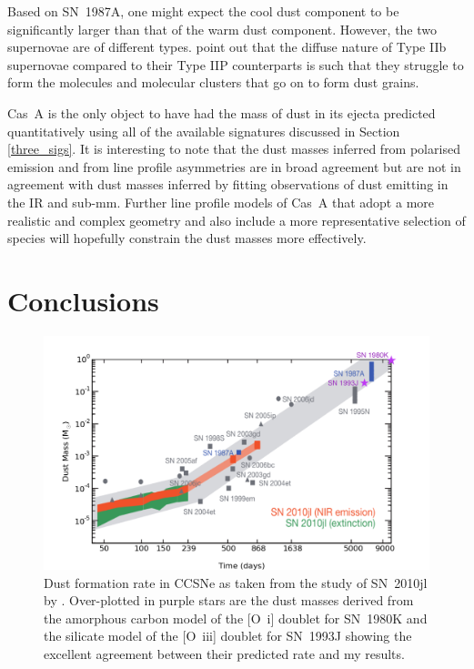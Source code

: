 Based on SN~1987A, one might expect the cool dust component to be significantly larger than that of the warm dust component.  However, the two supernovae are of different types. \citet{Biscaro2014} point out that the diffuse nature of Type IIb supernovae compared to their Type IIP counterparts is such that they struggle to form the molecules and molecular clusters that go on to form dust grains.   

Cas~A is the only object to have had the mass of dust in its ejecta predicted quantitatively using all of the available signatures discussed in Section \ref{three_sigs}.  It is interesting to note that the dust masses inferred from polarised emission and from line profile asymmetries are in broad agreement but are not in agreement with dust masses inferred by fitting observations of dust emitting in the IR and sub-mm.  Further line profile models of Cas~A that adopt a more realistic and complex geometry  and also include a more representative selection of species will hopefully constrain the dust masses more effectively.  

\section{Conclusions}

\begin{figure}
\centering
\includegraphics[scale=0.6,clip=true, trim=30 0 50 0]{chapters/chapter6/figs/test2.png}
\caption{Dust formation rate in CCSNe as taken from the study of SN~2010jl by \citet{Gall2014}.  Over-plotted in purple stars are the dust masses derived from the amorphous carbon model of the [O~{\sc i}] doublet for SN~1980K and the silicate model of the [O~{\sc iii}] doublet for SN~1993J showing the excellent agreement between their predicted rate and my results.}
\label{dust_masses_gall}
\end{figure}


